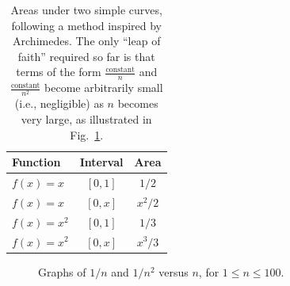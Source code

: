 \begin{table}
\centering 
\begin{tabular}{|l|c|c|}
\hline   
Function & Interval & Area \\ \hline 
\hline
$f(x) = x$ & $[0, 1]$ & $1/2$ \\ \hline
$f(x) = x$ & $[0, x]$ & $x^2/2$ \\ \hline 
$f(x) = x^2$ & $[0, 1]$ & $1/3$ \\ \hline 
$f(x) = x^2$ & $[0, x]$ & $x^3/3$ \\ 
\hline
\end{tabular}
\caption{Areas under two simple curves, following a method inspired by Archimedes. The only ``leap of faith'' required so far is that terms of the form $\frac{\text{constant}}{n}$ and $\frac{\text{constant}}{n^2}$ become arbitrarily small (i.e., negligible) as $n$ becomes very large, as illustrated in Fig.~\ref{fig:OneOverNandNsquaredConvergingToZero}.}
\label{tab:FirstIntegrals}
\end{table}

\begin{figure}[htb]%
\centering
{}%
    \caption[]{Graphs of $1/n$ and $1/n^2$ versus $n$, for $1 \le n \le 100$.}
    \label{fig:OneOverNandNsquaredConvergingToZero}
\end{figure}

\clearpage

